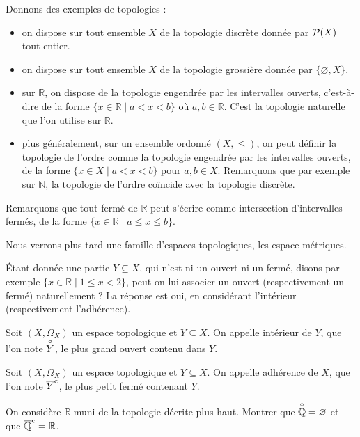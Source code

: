\begin{example}
  Donnons des exemples de topologies :
  \begin{itemize}
  \item on dispose sur tout ensemble $X$ de la topologie discrète donnée par
    $\mathcal{P}(X)$ tout entier.
  \item on dispose sur tout ensemble $X$ de la topologie grossière donnée
    par $\{\varnothing,X\}$.
  \item sur $\mathbb R$, on dispose de la topologie engendrée par les
    intervalles ouverts, c'est-à-dire de la forme
    $\{x \in \mathbb R \mid a < x < b\}$ où
    $a,b\in\mathbb R$. C'est la topologie naturelle que l'on utilise sur
    $\mathbb R$.
  \item plus généralement, sur un ensemble ordonné $(X,\leq)$, on peut définir
    la topologie de l'ordre comme la topologie engendrée par les intervalles
    ouverts, de la forme $\{x\in X\mid a < x < b\}$ pour $a,b\in X$.
    Remarquons que par exemple sur $\mathbb N$, la topologie de l'ordre coïncide
    avec la topologie discrète.
  \end{itemize}
\end{example}

Remarquons que tout fermé de $\mathbb R$ peut s'écrire comme intersection
d'intervalles fermés, de la forme $\{x\in \mathbb R \mid a\leq  x \leq b\}$.

Nous verrons plus tard une famille d'espaces topologiques, les espace métriques.

\'Etant donnée une partie $Y\subseteq X$, qui n'est ni un ouvert ni un fermé,
disons par exemple $\{x\in\mathbb R\mid 1 \leq x < 2\}$, peut-on lui associer
un ouvert (respectivement un fermé) naturellement ? La réponse est oui, en
considérant l'intérieur (respectivement l'adhérence).

\begin{definition}[Intérieur]
  Soit $(X,\Omega_X)$ un espace topologique et $Y\subseteq X$. On appelle
  intérieur de $Y$, que l'on note $\overset{\circ}{Y}$, le plus grand ouvert contenu dans
  $Y$.
\end{definition}

\begin{definition}[Adhérence]
  Soit $(X,\Omega_X)$ un espace topologique et $Y\subseteq X$. On appelle
  adhérence de $X$, que l'on note $\overline{Y}^{\mathrm c}$, le plus petit fermé contenant
  $Y$.
\end{definition}

\begin{exercise}
  On considère $\mathbb R$ muni de la topologie décrite plus haut. Montrer que
  $\overset{\circ}{\mathbb Q} = \varnothing$ et que $\overline{\mathbb Q}^{\mathrm c} = \mathbb R$.
\end{exercise}

